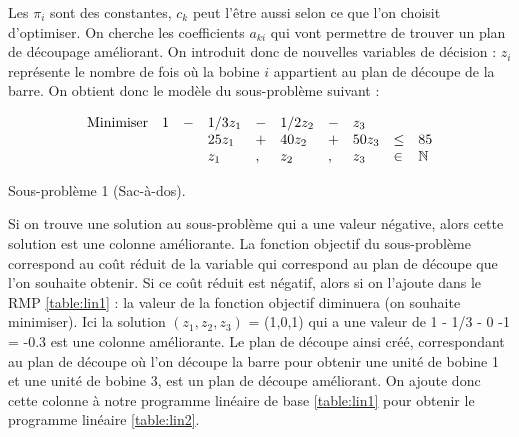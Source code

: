 Les $\pi_i$  sont des constantes, $c_k$ peut l'être aussi selon ce que l'on choisit d'optimiser. On cherche les coefficients $a_{ki}$ qui vont permettre de trouver un plan de découpage améliorant.
On introduit donc de nouvelles variables de décision : $z_i$ représente le nombre de fois où la bobine $i$ appartient au plan de découpe de la barre.
On obtient donc le modèle du sous-problème suivant : \\

\begin{table}[H]
\centering
$$
\begin{array}{*{10}l}
\text{Minimiser} & 1 & - &1/3z_1 & - & 1/2z_2 & - & z_3\\
& & &25z_1 & + & 40z_2 & + & 50z_3 & \leq & 85\\
& & &z_1 & , & z_2 & , & z_3 & \in & \mathbb{N}
\end{array}
$$
\caption{Sous-problème 1 (Sac-à-dos). \label{table:psp}}
\end{table}



Si on trouve une solution au sous-problème qui a une valeur négative, alors cette solution est une colonne améliorante. 
La fonction objectif du sous-problème correspond au coût réduit de la variable qui correspond au plan de découpe que l'on souhaite obtenir. Si ce coût réduit est négatif, alors si on l'ajoute dans le RMP \ref{table:lin1} : la valeur de la fonction objectif diminuera (on souhaite minimiser).
Ici la solution $(z_1,z_2,z_3)$ = (1,0,1) qui a une valeur de 1 - 1/3 - 0 -1 = -0.3 est une colonne améliorante. 
Le plan de découpe ainsi créé, correspondant au plan de découpe où l'on découpe la barre pour obtenir une unité de bobine 1 et une unité de bobine 3, est un plan de découpe améliorant.
On ajoute donc cette colonne à notre programme linéaire de base \ref{table:lin1} pour obtenir le programme linéaire \ref{table:lin2}.

